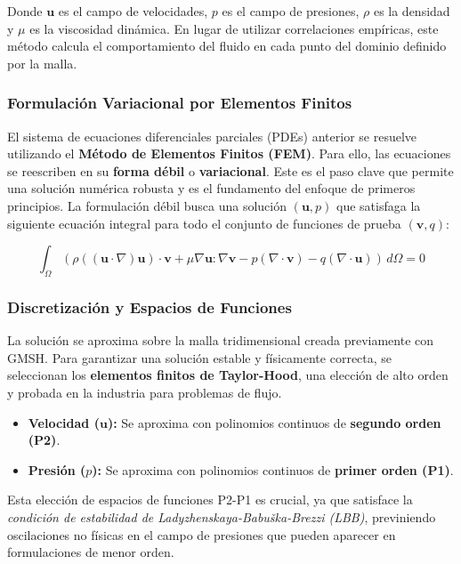 \documentclass[11pt, a4paper,oneside]{article}
\begin{document}
Donde $\mathbf{u}$ es el campo de velocidades, $p$ es el campo de presiones, $\rho$ es la densidad y $\mu$ es la viscosidad dinámica. En lugar de utilizar correlaciones empíricas, este método calcula el comportamiento del fluido en cada punto del dominio definido por la malla.

\subsubsection{Formulación Variacional por Elementos Finitos}
El sistema de ecuaciones diferenciales parciales (PDEs) anterior se resuelve utilizando el \textbf{Método de Elementos Finitos (FEM)}. Para ello, las ecuaciones se reescriben en su \textbf{forma débil} o \textbf{variacional}. Este es el paso clave que permite una solución numérica robusta y es el fundamento del enfoque de primeros principios. La formulación débil busca una solución $(\mathbf{u}, p)$ que satisfaga la siguiente ecuación integral para todo el conjunto de funciones de prueba $(\mathbf{v}, q)$:

\begin{equation} \label{eq:weakform}
    \int_{\Omega} \left( \rho((\mathbf{u} \cdot \nabla)\mathbf{u}) \cdot \mathbf{v} + \mu \nabla \mathbf{u} : \nabla \mathbf{v} - p (\nabla \cdot \mathbf{v}) - q (\nabla \cdot \mathbf{u}) \right) \,d\Omega = 0
\end{equation}

\subsubsection{Discretización y Espacios de Funciones}
La solución se aproxima sobre la malla tridimensional creada previamente con GMSH. Para garantizar una solución estable y físicamente correcta, se seleccionan los \textbf{elementos finitos de Taylor-Hood}, una elección de alto orden y probada en la industria para problemas de flujo.
\begin{itemize}
    \itemsep0em
    \item \textbf{Velocidad ($\mathbf{u}$):} Se aproxima con polinomios continuos de \textbf{segundo orden (P2)}.
    \item \textbf{Presión ($p$):} Se aproxima con polinomios continuos de \textbf{primer orden (P1)}.
\end{itemize}
Esta elección de espacios de funciones P2-P1 es crucial, ya que satisface la \textit{condición de estabilidad de Ladyzhenskaya-Babuška-Brezzi (LBB)}, previniendo oscilaciones no físicas en el campo de presiones que pueden aparecer en formulaciones de menor orden.
\end{document}
